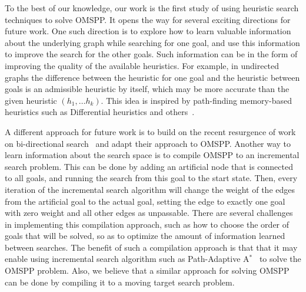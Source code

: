 \documentclass[smallextended]{svjour3}       %
\newcommand{\omspp}{\ac{OMSPP}\xspace}
\newcommand{\astar}{A$^*$\xspace}
\newcommand{\roni}[1]{\textbf{[RS:#1]}}
\begin{document}
To the best of our knowledge, our work is the first study of using heuristic search techniques to solve \omspp. 
It opens the way for several exciting directions for future work. 
One such direction is to explore how to learn valuable information about the underlying graph while searching for one goal, and use this information to improve the search for the other goals. %
Such information can be in the form of improving the quality of the available heuristics. 
For example, in undirected graphs the difference between the heuristic for one goal and the heuristic between goals is an admissible heuristic by itself, which may be more accurate than the given heuristic $(h_1, \ldots h_k)$.
This idea is inspired by path-finding memory-based heuristics such as Differential heuristics and others~\cite{sturtevant2007memory,SturtevantFBSN2009,goldenberg2011theCompressed}.


A different approach for future work is to build on the recent resurgence of work on bi-directional search~\cite{MMAAAI16,sturtevant2018aBrief,shaham2018minimizing} and adapt their approach to \omspp. 
Another way to learn information about the search space is to compile \omspp to an incremental search problem. This can be done by adding an artificial node that is connected to all goals, and running the search from this goal to the start state.
Then, every iteration of the incremental search algorithm will change the weight of the edges from the artificial goal to the actual goal, setting the edge to exactly one goal with zero weight and all other edges as unpassable.
There are several challenges in implementing this compilation approach, such as how to choose the order of goals that will be solved, so as to optimize the amount of information learned between searches.
The benefit of such a compilation approach is that that it may enable using incremental search algorithm such as Path-Adaptive \astar~\cite{hernandez2015reusing} to solve the \omspp problem.
Also, we believe that a similar approach for solving \omspp can be done by compiling it to a moving target search problem.
\end{document}
